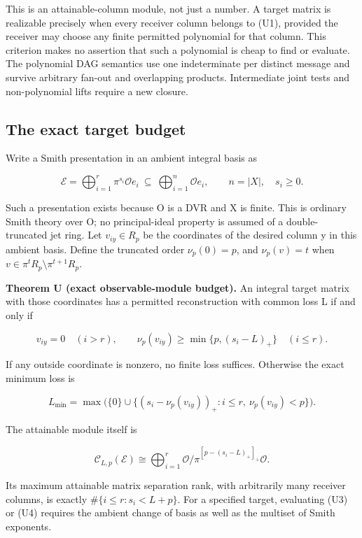 \documentclass[
  11pt,
]{article}
\begin{document}
This is an attainable-column module, not just a number. A target matrix
is realizable precisely when every receiver column belongs to (U1),
provided the receiver may choose any finite permitted polynomial for
that column. This criterion makes no assertion that such a polynomial is
cheap to find or evaluate. The polynomial DAG semantics use one
indeterminate per distinct message and survive arbitrary fan-out and
overlapping products. Intermediate joint tests and non-polynomial lifts
require a new closure.

\subsection{The exact target budget}\label{v8-the-exact-target-budget}

Write a Smith presentation in an ambient integral basis as

\[
 \mathcal E=\bigoplus_{i=1}^{r}\pi^{s_i}\mathcal O e_i
 \ \subseteq\ \bigoplus_{i=1}^{n}\mathcal O e_i,
 \qquad n=|X|,\quad s_i\ge0. \tag{U2}
\]

Such a presentation exists because O is a DVR and X is finite. This is
ordinary Smith theory over O; no principal-ideal property is assumed of
a double-truncated jet ring. Let \(v_{iy}\in R_p\) be the coordinates of
the desired column y in this ambient basis. Define the truncated order
\(\nu_p(0)=p\), and \(\nu_p(v)=t\) when
\(v\in\pi^tR_p\setminus\pi^{t+1}R_p\).

\textbf{Theorem U (exact observable-module budget).} An integral target
matrix with those coordinates has a permitted reconstruction with common
loss L if and only if

\[
 v_{iy}=0\quad(i>r),\qquad
 \nu_p(v_{iy})\ge\min\{p,(s_i-L)_+\}\quad(i\le r). \tag{U3}
\]

If any outside coordinate is nonzero, no finite loss suffices. Otherwise
the exact minimum loss is

\[
 L_{\min}=\max\bigl(\{0\}\cup
     \{(s_i-\nu_p(v_{iy}))_+:i\le r,\ \nu_p(v_{iy})<p\}\bigr).
 \tag{U4}
\]

The attainable module itself is

\[
 \mathcal C_{L,p}(\mathcal E)\cong
 \bigoplus_{i=1}^{r}
 \mathcal O/\pi^{[p-(s_i-L)_+]_+}\mathcal O. \tag{U5}
\]

Its maximum attainable matrix separation rank, with arbitrarily many
receiver columns, is exactly \(\#\{i\le r:s_i<L+p\}\). For a specified
target, evaluating (U3) or (U4) requires the ambient change of basis as
well as the multiset of Smith exponents.
\end{document}
